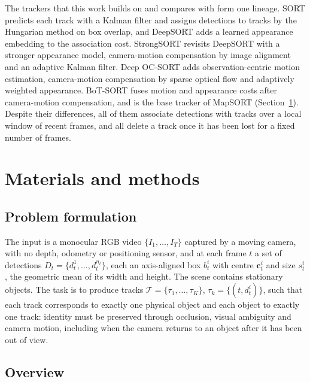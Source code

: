 \documentclass[pdflatex,sn-basic]{sn-jnl}%
\theoremstyle{thmstyleone}%
\newcommand{\bc}{\bm{c}}
\begin{document}
The trackers that this work builds on and compares with form one lineage.
SORT \citep{bewley2016sort} predicts each track with a Kalman filter and assigns detections to tracks by the Hungarian method on box overlap, and DeepSORT \citep{wojke2017deepsort} adds a learned appearance embedding to the association cost.
StrongSORT \citep{du2023strongsort} revisits DeepSORT with a stronger appearance model, camera-motion compensation by image alignment and an adaptive Kalman filter.
Deep OC-SORT \citep{maggiolino2023deepocsort} adds observation-centric motion estimation, camera-motion compensation by sparse optical flow and adaptively weighted appearance.
BoT-SORT \citep{aharon2022botsort} fuses motion and appearance costs after camera-motion compensation, and is the base tracker of MapSORT (Section~\ref{sec:methods}).
Despite their differences, all of them associate detections with tracks over a local window of recent frames, and all delete a track once it has been lost for a fixed number of frames.

\section{Materials and methods}\label{sec:methods}

\subsection{Problem formulation}\label{sec:problem}

The input is a monocular RGB video $\{I_1,\dots,I_T\}$ captured by a moving camera, with no depth, odometry or positioning sensor, and at each frame $t$ a set of detections $D_t=\{d_t^1,\dots,d_t^{n_t}\}$, each an axis-aligned box $b_t^i$ with centre $\bc_t^i$ and size $s_t^i$, the geometric mean of its width and height. The scene contains stationary objects. The task is to produce tracks $\mathcal{T}=\{\tau_1,\dots,\tau_K\}$, $\tau_k=\{(t,d_t^i)\}$, such that each track corresponds to exactly one physical object and each object to exactly one track: identity must be preserved through occlusion, visual ambiguity and camera motion, including when the camera returns to an object after it has been out of view.

\subsection{Overview}\label{sec:overview}
\end{document}
